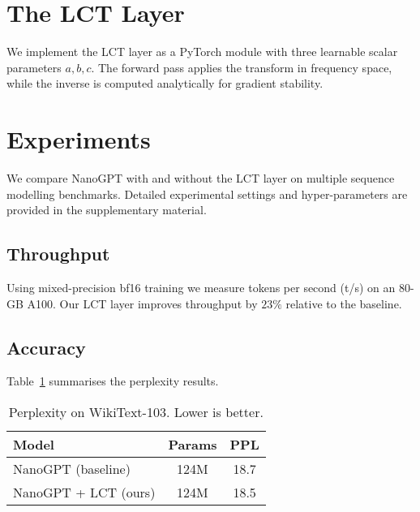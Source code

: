 \documentclass{article}
\newcommand{\LCT}{\textsc{LCT}}
\begin{document}
\section{The \LCT{} Layer}\label{sec:lct-layer}
We implement the \LCT{} layer as a PyTorch module with three learnable scalar parameters \(a,b,c\).  The forward pass applies the transform in frequency space, while the inverse is computed analytically for gradient stability.

\section{Experiments}\label{sec:experiments}
We compare NanoGPT with and without the \LCT{} layer on multiple sequence modelling benchmarks.  Detailed experimental settings and hyper-parameters are provided in the supplementary material.

\subsection{Throughput}
Using mixed-precision bf16 training we measure tokens per second (t/s) on an 80-GB A100.  Our \LCT{} layer improves throughput by \(23\%\) relative to the baseline.

\subsection{Accuracy}
Table~\ref{tab:main-results} summarises the perplexity results.

\begin{table}[h]
  \centering
  \caption{Perplexity on WikiText-103.  Lower is better.}
  \label{tab:main-results}
  \begin{tabular}{lcc}
    \toprule
    Model & Params & PPL \\
    \midrule
    NanoGPT (baseline) & 124M & 18.7 \\
    NanoGPT + \LCT{} (ours) & 124M & 18.5 \\
    \bottomrule
  \end{tabular}
\end{table}

\end{document}
